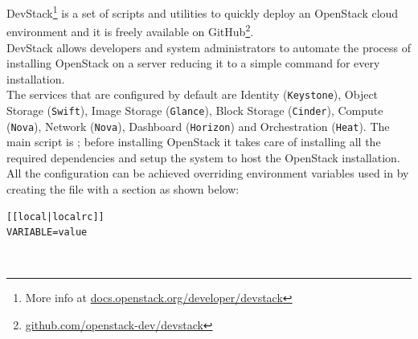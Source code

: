  
DevStack\footnote{More info at \url{docs.openstack.org/developer/devstack}} is a set of scripts and utilities to quickly deploy an OpenStack cloud environment and it is freely available on GitHub\footnote{\url{github.com/openstack-dev/devstack}}.\\
DevStack allows developers and system administrators to automate the process of installing OpenStack on a server reducing it to a simple command for every installation.\\
The services that are configured by default are Identity (\texttt{Keystone}), Object Storage (\texttt{Swift}), Image Storage (\texttt{Glance}), Block Storage (\texttt{Cinder}), Compute (\texttt{Nova}), Network (\texttt{Nova}), Dashboard (\texttt{Horizon}) and Orchestration (\texttt{Heat}).
The main script is ; before installing OpenStack it takes care of installing all the required dependencies and setup the system to host the OpenStack installation. All the configuration can be achieved overriding environment variables used in  by creating the file  with a  section as shown below:\\
\begin{lstlisting}[numbers=none]
[[local|localrc]]
VARIABLE=value
\end{lstlisting}
\\
